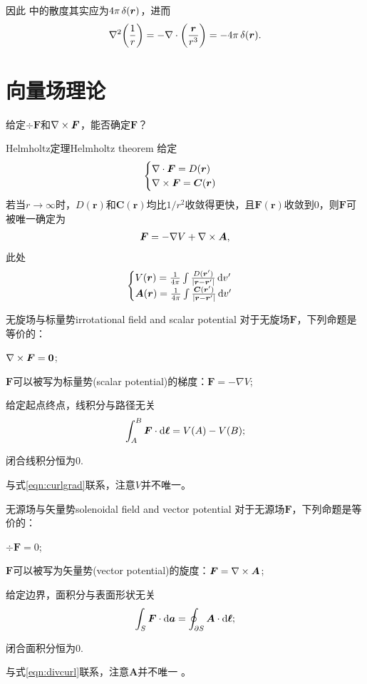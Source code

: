 因此 中的散度其实应为$4\pi\mathop{}\!\delta(\bm r)$，进而
\begin{equation}
    \nabla^2\biggl(\frac1r\biggr)=-\nabla\cdot\biggl(\frac{\bm r}{r^3}\biggr)=-4\pi\mathop{}\!\delta(\bm r).
\end{equation}
\section{向量场理论}
给定$\div\bm F$和$\nabla\times\bm F$，能否确定$\bm F$？
\begin{theorem}{Helmholtz定理}{Helmholtz theorem}
    给定
    \[
        \begin{cases}
            \nabla\cdot\bm F=D(\bm r)\\
            \nabla\times\bm F=\bm C(\bm r)
        \end{cases}
    \]
    若当$r\to\infty$时，$D(\bm r)$和$\bm C(\bm r)$均比$1/r^2$收敛得更快，且$\bm F(\bm r)$收敛到0，则$\bm F$可被唯一确定为
    \begin{align}
        \bm F=-\nabla V+\nabla\times\bm A,
    \end{align}
    此处
    \begin{align}
        \begin{cases}
            V(\bm r)=\frac1{4\pi}\int\frac{D(\bm r')}{|\bm r-\bm r'|}\mathop{}\!\mathrm{d} v'\\
            \bm A(\bm r)=\frac1{4\pi}\int\frac{\bm C(\bm r')}{|\bm r-\bm r'|}\mathop{}\!\mathrm{d} v'
        \end{cases}
    \end{align}
\end{theorem}
\begin{theorem}{无旋场与标量势}{irrotational field and scalar potential}
    对于无旋场$\bm F$，下列命题是等价的：
    \begin{compactitem}
        \item $\nabla\times\bm F=\bm 0$;
        \item $\bm F$可以被写为标量势(scalar potential)的梯度：$\bm F=-\nabla V$;
        \item 给定起点终点，线积分与路径无关\[
            \int_A^B\bm F\cdot\mathop{}\!\mathrm{d}\bm\ell=V(A)-V(B);
        \]
        \item 闭合线积分恒为0.
    \end{compactitem}
\end{theorem}
与式\eqref{eqn:curlgrad}联系，注意$V$并不唯一。
\begin{theorem}{无源场与矢量势}{solenoidal field and vector potential}
    对于无源场$\bm F$，下列命题是等价的：
    \begin{compactitem}
        \item $\div\bm F=0$;
        \item $\bm F$可以被写为矢量势(vector potential)的旋度：$\bm F=\nabla\times\bm A$;
        \item 给定边界，面积分与表面形状无关
        \[
            \int_S\bm F\cdot\mathop{}\!\mathrm{d}\bm a=\oint_{\partial S}\bm A\cdot\mathop{}\!\mathrm{d}\bm\ell;
        \]
        \item 闭合面积分恒为0.
    \end{compactitem}
\end{theorem}
与式\eqref{eqn:divcurl}联系，注意$\bm A$并不唯一 。

